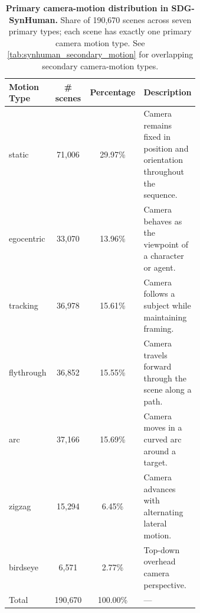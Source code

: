 \documentclass{llmxive}
\begin{document}
\begin{table}[t]
\centering
\captionsetup{justification=raggedright, singlelinecheck=false}
\small
\begin{tabular}{p{0.16\linewidth}ccp{0.48\linewidth}}
\toprule
Motion Type & \# scenes & Percentage & Description \\
\midrule
static     & 71{,}006  & 29.97\%  & Camera remains fixed in position and orientation throughout the sequence. \\
egocentric & 33{,}070  & 13.96\%  & Camera behaves as the viewpoint of a character or agent. \\
tracking   & 36{,}978  & 15.61\%  & Camera follows a subject while maintaining framing. \\
flythrough & 36{,}852  & 15.55\%  & Camera travels forward through the scene along a path. \\
arc        & 37{,}166  & 15.69\%  & Camera moves in a curved arc around a target. \\
zigzag     & 15{,}294  &  6.45\%  & Camera advances with alternating lateral motion. \\
birdseye   &  6{,}571  &  2.77\%  & Top-down overhead camera perspective. \\
\midrule
Total      & 190{,}670 & 100.00\% & --- \\
\bottomrule
\end{tabular}
\caption{\textbf{Primary camera-motion distribution in SDG-SynHuman.} Share of 190{,}670 scenes across seven primary types; each scene has exactly one primary camera motion type. See \cref{tab:synhuman_secondary_motion} for overlapping secondary camera-motion types.}
\label{tab:synhuman_primary_motion}
\end{table}
 
\end{document}

